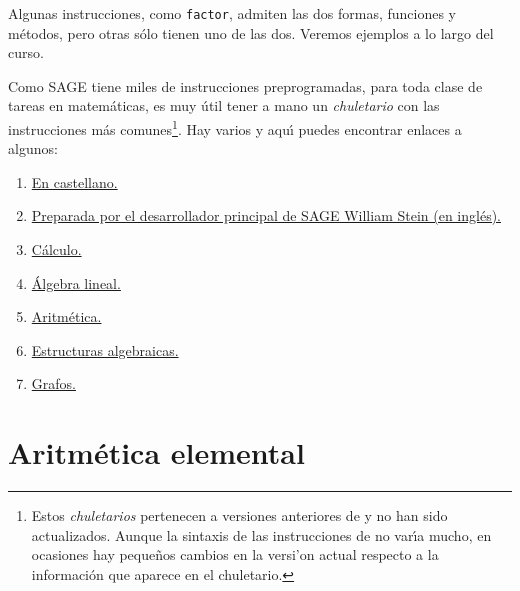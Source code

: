 Algunas instrucciones, como \lstinline|factor|, admiten las dos formas,
funciones y m\'etodos, pero otras s\'olo tienen uno de las dos. Veremos ejemplos
a lo largo del curso. 


Como SAGE tiene miles de instrucciones preprogramadas, para toda clase de tareas
en matem\'aticas, es muy \'util tener a mano un {\itshape chuletario} con las
instrucciones m\'as comunes\footnote{Estos {\itshape chuletarios} pertenecen a versiones anteriores de {\sage} y no han sido actualizados. Aunque la sintaxis de las instrucciones de {\sage} no var\'{\i}a mucho, en ocasiones hay peque\~nos cambios en la versi'on actual respecto a la informaci\'on que aparece en el chuletario.}.  Hay varios y aqu\'{\i} puedes encontrar enlaces a
algunos:
\label{chuletas}
\begin{enumerate}\itemsep=-2pt
 \item  \href{http://150.244.21.37/PDFs/CAVAN/VisitaSAGE.pdf}{En castellano.} 
 \item  \href{http://150.244.21.37/PDFs/CAVAN/quickref.pdf}{Preparada por el desarrollador
principal de SAGE William Stein (en ingl\'es).} 
 \item  \href{http://150.244.21.37/PDFs/CAVAN/quickref-calc.pdf}{C\'alculo.} 
 \item  \href{http://150.244.21.37/PDFs/CAVAN/quickref-linalg.pdf}{\'Algebra lineal.} 
 \item  \href{http://150.244.21.37/PDFs/CAVAN/quickref-nt.pdf}{Aritm\'etica.} 
 \item  \href{http://150.244.21.37/PDFs/CAVAN/quickref-algebra.pdf}{Estructuras algebraicas.} 
 \item  \href{http://150.244.21.37/PDFs/CAVAN/quickref-graphtheory.pdf}{Grafos.}
\end{enumerate}




\section{Aritmética elemental}

